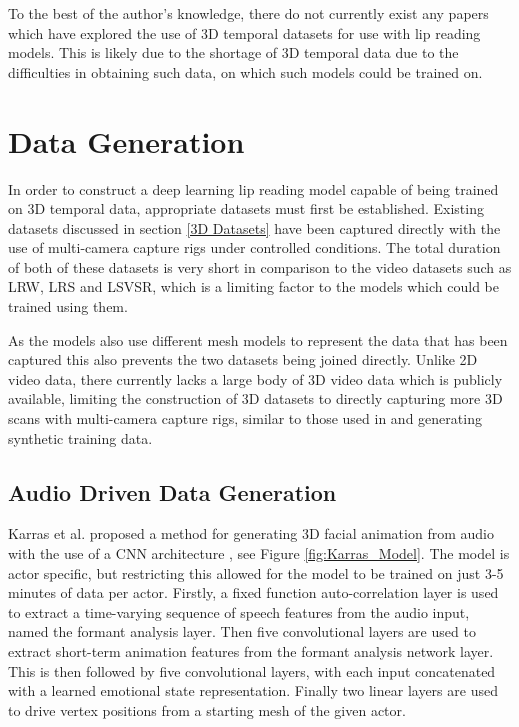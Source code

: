 To the best of the author's knowledge, there do not currently exist any papers which have explored the use of 3D temporal datasets for use with lip reading models. 
This is likely due to the shortage of 3D temporal data due to the difficulties in obtaining such data, on which such models could be trained on.

\section{Data Generation}
In order to construct a deep learning lip reading model capable of being trained on 3D temporal data, appropriate datasets must first be established.
Existing datasets \cite{Tzirakis2019, Cudeiro2019} discussed in section \ref{3D Datasets} have been captured directly with the use of multi-camera capture rigs under controlled conditions.
The total duration of both of these datasets is very short in comparison to the video datasets such as LRW, LRS and LSVSR, which is a limiting factor to the models which could be trained using them.

As the models also use different mesh models to represent the data that has been captured this also prevents the two datasets being joined directly.
Unlike 2D video data, there currently lacks a large body of 3D video data which is publicly available, limiting the construction of 3D datasets to directly capturing more 3D scans with multi-camera capture rigs, similar to those used in \cite{Tzirakis2019, Cudeiro2019} and generating synthetic training data.

\subsection{Audio Driven Data Generation}
Karras et al. proposed a method for generating 3D facial animation from audio with the use of a CNN architecture \cite{Karras2017a}, see Figure \ref{fig:Karras_Model}.
The model is actor specific, but restricting this allowed for the model to be trained on just 3-5 minutes of data per actor.
Firstly, a fixed function auto-correlation layer is used to extract a time-varying sequence of speech features from the audio input, named the formant analysis layer.
Then five convolutional layers are used to extract short-term animation features from the formant analysis network layer.
This is then followed by five convolutional layers, with each input concatenated with a learned emotional state representation.
Finally two linear layers are used to drive vertex positions from a starting mesh of the given actor.

